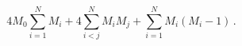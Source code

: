 \begin{equation}
4M_{0}\sum_{i=1}^{N}M_{i}+4\sum_{i<j}^{N}M_{i}M_{j}+%
\sum_{i=1}^{N}M_{i}(M_{i}-1)\,.
\end{equation}

